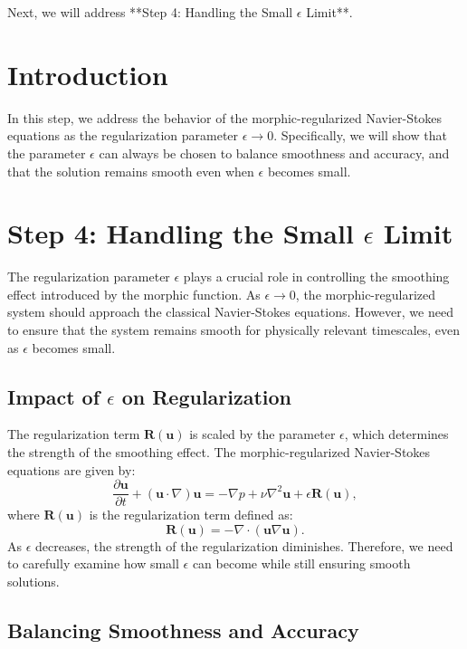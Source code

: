 \documentclass{article}
\begin{document}
Next, we will address **Step 4: Handling the Small \( \epsilon \) Limit**.
\section*{Introduction}

In this step, we address the behavior of the morphic-regularized Navier-Stokes equations as the regularization parameter \( \epsilon \to 0 \). Specifically, we will show that the parameter \( \epsilon \) can always be chosen to balance smoothness and accuracy, and that the solution remains smooth even when \( \epsilon \) becomes small.

\section{Step 4: Handling the Small \( \epsilon \) Limit}

The regularization parameter \( \epsilon \) plays a crucial role in controlling the smoothing effect introduced by the morphic function. As \( \epsilon \to 0 \), the morphic-regularized system should approach the classical Navier-Stokes equations. However, we need to ensure that the system remains smooth for physically relevant timescales, even as \( \epsilon \) becomes small.

\subsection*{Impact of \( \epsilon \) on Regularization}

The regularization term \( \mathbf{R}(\mathbf{u}) \) is scaled by the parameter \( \epsilon \), which determines the strength of the smoothing effect. The morphic-regularized Navier-Stokes equations are given by:
\[
\frac{\partial \mathbf{u}}{\partial t} + (\mathbf{u} \cdot \nabla) \mathbf{u} = -\nabla p + \nu \nabla^2 \mathbf{u} + \epsilon \mathbf{R}(\mathbf{u}),
\]
where \( \mathbf{R}(\mathbf{u}) \) is the regularization term defined as:
\[
\mathbf{R}(\mathbf{u}) = -\nabla \cdot (\mathbf{u} \nabla \mathbf{u}).
\]
As \( \epsilon \) decreases, the strength of the regularization diminishes. Therefore, we need to carefully examine how small \( \epsilon \) can become while still ensuring smooth solutions.

\subsection*{Balancing Smoothness and Accuracy}
\end{document}
